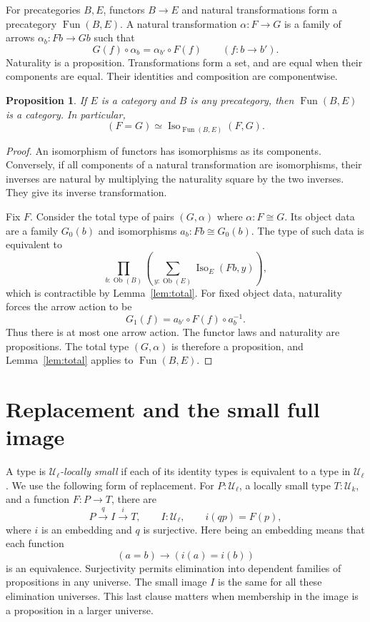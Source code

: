 \documentclass[11pt]{amsart}
\newtheorem{proposition}[theorem]{Proposition}
\theoremstyle{definition}
\theoremstyle{remark}
\newcommand{\UU}{\mathcal U}
\newcommand{\Iso}{\operatorname{Iso}}
\newcommand{\Fun}{\operatorname{Fun}}
\newcommand{\Ob}{\operatorname{Ob}}
\begin{document}
For precategories $B,E$, functors $B\to E$ and natural transformations
form a precategory $\Fun(B,E)$. A natural transformation $\alpha:F\to G$
is a family of arrows $\alpha_b:Fb\to Gb$ such that
\[
 G(f)\circ\alpha_b=\alpha_{b'}\circ F(f)\qquad(f:b\to b').
\]
Naturality is a proposition. Transformations form a set, and are equal
when their components are equal. Their identities and composition are
componentwise.

\begin{proposition}\label{prop:fununiv}
If $E$ is a category and $B$ is any precategory, then $\Fun(B,E)$ is a
category. In particular,
\[
 (F=G)\simeq\Iso_{\Fun(B,E)}(F,G).
\]
\end{proposition}
\begin{proof}
An isomorphism of functors has isomorphisms as its components. Conversely,
if all components of a natural transformation are isomorphisms, their
inverses are natural by multiplying the naturality square by the two
inverses. They give its inverse transformation.

Fix $F$. Consider the total type of pairs $(G,\alpha)$ where $\alpha:F\cong G$.
Its object data are a family $G_0(b)$ and isomorphisms
$a_b:Fb\cong G_0(b)$. The type of such data is equivalent to
\[
 \prod_{b:\Ob(B)}\left(\sum_{y:\Ob(E)}\Iso_E(Fb,y)\right),
\]
which is contractible by Lemma~\ref{lem:total}. For fixed object data,
naturality forces the arrow action to be
\[
 G_1(f)=a_{b'}\circ F(f)\circ a_b^{-1}.
\]
Thus there is at most one arrow action. The functor laws and naturality
are propositions. The total type $(G,\alpha)$ is therefore a proposition,
and Lemma~\ref{lem:total} applies to $\Fun(B,E)$.
\end{proof}

\section{Replacement and the small full image}

A type is \emph{$\UU_\ell$-locally small} if each of its identity types is
equivalent to a type in $\UU_\ell$. We use the following form of
replacement. For $P:\UU_\ell$, a locally small type $T:\UU_k$, and a
function $F:P\to T$, there are
\[
 P\xrightarrow{q}I\xrightarrow{i}T,\qquad I:\UU_\ell,
 \qquad i(qp)=F(p),
\]
where $i$ is an embedding and $q$ is surjective. Here being an embedding
means that each function
\[
 (a=b)\longrightarrow(i(a)=i(b))
\]
is an equivalence. Surjectivity permits elimination into dependent
families of propositions in any universe. The small image $I$ is the
same for all these elimination universes. This last clause matters when
membership in the image is a proposition in a larger universe.
\end{document}
